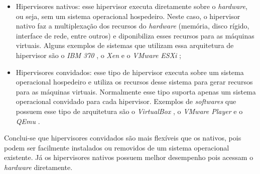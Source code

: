 \begin{itemize}
 \item Hipervisores nativos: esse hipervisor executa diretamente sobre o \textit{hardware}, ou seja, sem um sistema operacional
 hospedeiro. Neste caso, o hipervisor nativo faz a multiplexação dos recursos do \textit{hardware} (memória, disco rígido, interface de rede, 
 entre outros) e diponibiliza esses recursos para as máquinas virtuais. Alguns exemplos de sistemas que utilizam essa arquitetura de hipervisor 
 são o \textit{IBM 370} \cite{ibm370}, o \textit{Xen} \cite{xen} e o \textit{VMware ESXi} \cite{vmwareesxi};
 \item Hipervisores convidados: esse tipo de hipervisor executa sobre um sistema operacional hospedeiro e utiliza os recursos desse sistema 
 para gerar recursos para as máquinas virtuais. Normalmente esse tipo suporta apenas um sistema operacional convidado para cada 
 hipervisor. Exemplos de \textit{softwares} que possuem esse tipo de arquitetura são o \textit{VirtualBox} \cite{virtualbox}, 
 o \textit{VMware Player} \cite{vmwareplayer} e o \textit{QEmu} \cite{qemu}.
\end{itemize}

Conclui-se que hipervisores convidados são mais flexíveis que os nativos, pois podem ser facilmente instalados ou removidos de um sistema
operacional existente. Já os hipervisores nativos possuem melhor desempenho pois acessam o \textit{hardware} diretamente.


